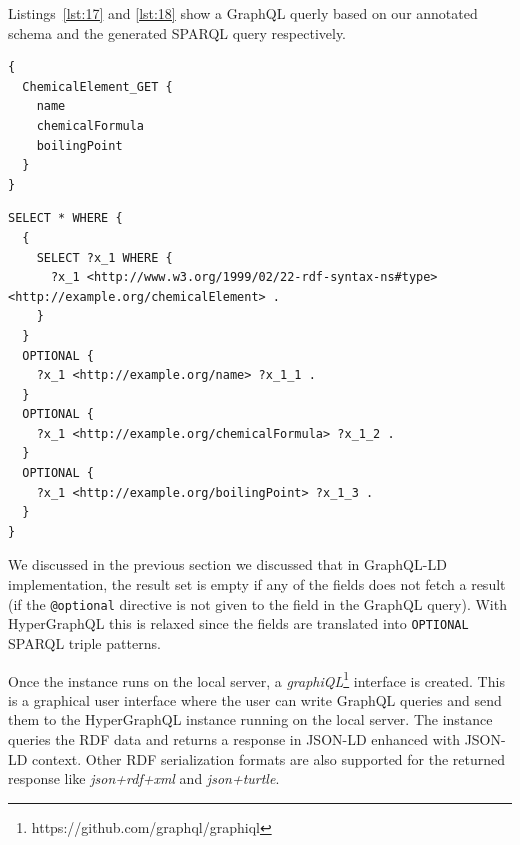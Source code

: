 Listings~\ref{lst:17} and \ref{lst:18} show a GraphQL querly based on our annotated schema and the generated SPARQL query respectively.


\begin{minipage}{\linewidth}
\begin{lstlisting}[label=lst:17, caption={An example query in HyperGraphQL}, language=GraphQL]
{
  ChemicalElement_GET {
    name
    chemicalFormula
    boilingPoint
  }
}
\end{lstlisting}
\end{minipage}


\begin{minipage}{\linewidth}
\begin{lstlisting}[columns=fullflexible, label=lst:18, caption={The generated SPARQL query}, language=SPARQL]
SELECT * WHERE { 
  { 
    SELECT ?x_1 WHERE { 
      ?x_1 <http://www.w3.org/1999/02/22-rdf-syntax-ns#type> <http://example.org/chemicalElement> . 
	}  
  }  
  OPTIONAL { 
    ?x_1 <http://example.org/name> ?x_1_1 . 
  }  
  OPTIONAL { 
    ?x_1 <http://example.org/chemicalFormula> ?x_1_2 . 
  }  
  OPTIONAL { 
    ?x_1 <http://example.org/boilingPoint> ?x_1_3 . 
  }  
}
\end{lstlisting}
\end{minipage}

We discussed in the previous section we discussed that in GraphQL-LD implementation, the result set is empty if any of the fields does not fetch a result (if the \texttt{@optional} directive is not given to the field in the GraphQL query). With HyperGraphQL this is relaxed since the fields are translated into \texttt{OPTIONAL} SPARQL triple patterns.

Once the instance runs on the local server, a \textit{graphiQL}\footnote{https://github.com/graphql/graphiql} interface is created. This is a graphical user interface where the user can write GraphQL queries and send them to the HyperGraphQL instance running on the local server. The instance queries the RDF data and returns a response in JSON-LD enhanced with JSON-LD context. Other RDF serialization formats are also supported for the returned response like \textit{json+rdf+xml} and \textit{json+turtle}. 